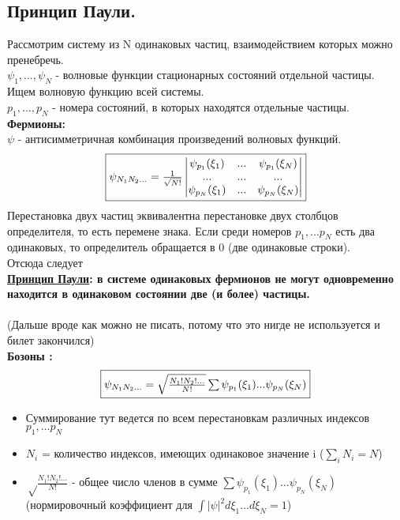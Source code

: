 \subsection {Принцип Паули.}
Рассмотрим систему из N одинаковых частиц, взаимодействием которых можно пренебречь. \\
$\psi_1, ..., \psi_N$ - волновые функции стационарных состояний отдельной частицы. Ищем волновую функцию всей системы.\\
$p_1,...,p_N$ - номера состояний, в которых находятся отдельные частицы.
\\
\textbf{Фермионы:}\\
$\psi$ - антисимметричная комбинация произведений волновых функций.
$$
\fbox{$
\psi_{N_1N_2...} = \frac{1}{\sqrt{N!}}
\begin{vmatrix}
\psi_{p_1}(\xi_1) & ... & \psi_{p_1}(\xi_N)\\
... &...&...\\
\psi_{p_N}(\xi_1) & ... & \psi_{p_N}(\xi_N)
\end{vmatrix}
$}
$$
Перестановка двух частиц эквивалентна перестановке двух столбцов определителя, то есть перемене знака.
Если среди номеров $p_1, ...p_N$ есть два одинаковых, то определитель обращается в 0 (две одинаковые строки).
\\
Отсюда следует \\
\textbf{\underline{Принцип Паули}: в системе одинаковых фермионов не могут одновременно находится в одинаковом состоянии две (и более) частицы.}
\\
\\
(Дальше вроде как можно не писать, потому что это нигде не используется и билет закончился)\\
\textbf{Бозоны :}\\
$$
\fbox{$
	\psi_{N_1N_2...} =\sqrt\frac{N_1!N_2!...}{N!} \sum \psi_{p_1}(\xi_1)...\psi_{p_N}(\xi_N)$}
$$
\begin{itemize}
	\item Суммирование тут ведется по всем перестановкам различных индексов $p_1, ...p_N$
	\item $N_i$ = количество индексов, имеющих одинаковое значение i ($\sum_{i}N_i = N$)
	\item $\sqrt\frac{N_1!N_2!...}{N!}$ - общее число членов в сумме $\sum \psi_{p_1}(\xi_1)...\psi_{p_N}(\xi_N)$ (нормировочный коэффициент для $\int |\psi|^2d\xi_1...d\xi_N = 1$)
\end{itemize}